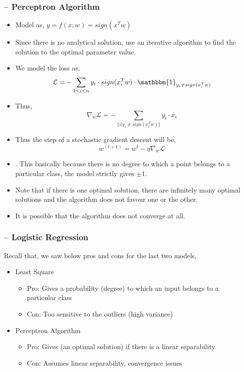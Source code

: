 \documentclass{article}
\begin{document}
\subsubsection{-- Perceptron Algorithm}
\begin{itemize}
    \item Model as, $y = f(x;w) = sign(x^Tw)$
    \item Since there is no analytical solution, use an iterative algorithm to find the solution to the optimal parameter value.
    \item We model the loss as, $$\mathcal{L} = -\sum_{1 \leq i \leq n}{ y_i\cdot sign(x_i^Tw)}\cdot \mathbbm{1}_{y_i \neq sign(x_i^Tw)}$$
    \item Thus, $$\nabla_w{\mathcal{L}} = -\sum_{\{i | {y_i \neq sign(x_i^Tw)}\}}{ y_i\cdot x_i}$$
    \item Thus the step of a stochastic gradient descent will be, $$w^{(t+1)} = w^t - \eta\nabla_w{\mathcal{L}}$$
    \item {}. This basically because there is no degree to which a point belongs to a particular class, the model strictly gives $\pm1$.
    \item Note that if there is one optimal solution, there are infinitely many optimal solutions and the algorithm does not favour one or the other.
    \item It is possible that the algorithm does not converge at all.
\end{itemize}

\subsubsection{-- Logistic Regression}
Recall that, we saw below pros and cons for the last two models,
\begin{itemize}
    \item Least Square
        \begin{itemize}
            \item Pro: Gives a probability (degree) to which an input belongs to a particular class
            \item Con: Too sensitive to the outliers (high variance)
        \end{itemize}
    \item Perceptron Algorithm
        \begin{itemize}
            \item Pro: Gives (an optimal solution) if there is a linear separability
            \item Con: Assumes linear separability, convergence issues
        \end{itemize}
\end{itemize}
\end{document}
